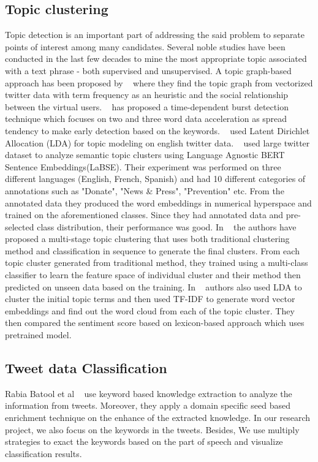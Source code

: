 \subsection{Topic clustering}
Topic detection is an important part of addressing the said problem to
separate points of interest among many candidates. Several noble studies have
been conducted in the last few decades to mine the most appropriate topic
associated with a text phrase - both supervised and unsupervised. A topic
graph-based approach has been proposed by ~\cite{cataldi2010emerging} where they find the topic
graph from vectorized twitter data with term frequency as an heuristic and
the social relationship between the virtual users. ~\cite{xie2016unsupervised} has proposed a
time-dependent burst detection technique which focuses on two and three word
data acceleration as spread tendency to make early detection based on the
keywords. ~\cite{abd2020top} used Latent Dirichlet Allocation (LDA) for topic modeling on
english twitter data. ~\cite{gencoglu2020large} used large twitter dataset to analyze semantic
topic clusters using Language Agnostic BERT Sentence Embeddings(LaBSE). Their
experiment was performed on three different languages (English, French,
Spanish) and had 10 different categories of annotations such
as "Donate", "News \& Press", "Prevention" etc. From the annotated data they
produced the word embeddings in numerical hyperspace and trained on the
aforementioned classes. Since they had annotated data and pre-selected class
distribution, their performance was good. In ~\cite{satu2021tclustvid} the authors have proposed a
multi-stage topic clustering that uses both traditional clustering method and
classification in sequence to generate the final clusters. From each topic
cluster generated from traditional method, they trained using a multi-class
classifier to learn the feature space of individual cluster and their method
then predicted on unseen data based on the training. In ~\cite{abdulaziz2021topic} authors also
used LDA to cluster the initial topic terms and then used TF-IDF to generate
word vector embeddings and find out the word cloud from each of the topic
cluster. They then compared the sentiment score based on lexicon-based
approach which uses pretrained model.

\subsection{Tweet data Classification}
Rabia Batool et al ~\cite{batool2013precise} use keyword based knowledge extraction to analyze the
information from tweets. Moreover, they apply a domain specific seed based
enrichment technique on the enhance of the extracted knowledge. In our
research project, we also focus on the keywords in the tweets. Besides, We
use multiply strategies to exact the keywords based on the part of speech and
visualize classification results. 

